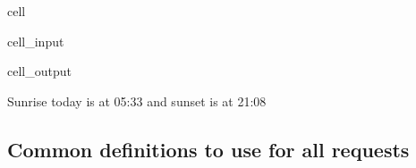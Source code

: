 \documentclass[letterpaper,10pt,english]{jupyterBook}
\begin{document}
\begin{sphinxuseclass}{cell}\begin{sphinxVerbatimInput}

\begin{sphinxuseclass}{cell_input}
\begin{sphinxVerbatim}[commandchars=\\\{\}]
  \PYG{p}{[}\PYG{p}{]}\PYG{p}{[}\PYG{p}{]}
  \PYG{p}{[}\PYG{p}{]}\PYG{p}{[}\PYG{p}{]}
\end{sphinxVerbatim}

\end{sphinxuseclass}\end{sphinxVerbatimInput}
\begin{sphinxVerbatimOutput}

\begin{sphinxuseclass}{cell_output}
\begin{sphinxVerbatim}[commandchars=\\\{\}]
Sunrise today is at 05:33 and sunset is at 21:08
\end{sphinxVerbatim}

\end{sphinxuseclass}\end{sphinxVerbatimOutput}

\end{sphinxuseclass}

\subsection{Common definitions to use for all requests}
\label{\detokenize{2_Data_sources/APIs/OpenWeather:id1}}
\end{document}
